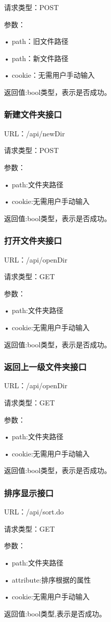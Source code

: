 请求类型：POST

参数：

• path：旧文件路径

• path：新文件路径

• cookie：无需用户手动输入

返回值:bool类型，表示是否成功。

\subsubsection{新建文件夹接口}
URL：/api/newDir

请求类型：POST

参数：

• path:文件夹路径

• cookie:无需用户手动输入

返回值:bool类型，表示是否成功。

\subsubsection{打开文件夹接口}
URL：/api/openDir

请求类型：GET

参数：

• path:文件夹路径

• cookie:无需用户手动输入

返回值:bool类型，表示是否成功。

\subsubsection{返回上一级文件夹接口}
URL：/api/openDir

请求类型：GET

参数：

• path:文件夹路径

• cookie:无需用户手动输入

返回值:bool类型，表示是否成功。

\subsubsection{排序显示接口}
URL：/api/sort.do

请求类型：GET

参数：

• path:文件夹路径

• attribute:排序根据的属性

• cookie:无需用户手动输入

返回值:bool类型,表示是否成功。

